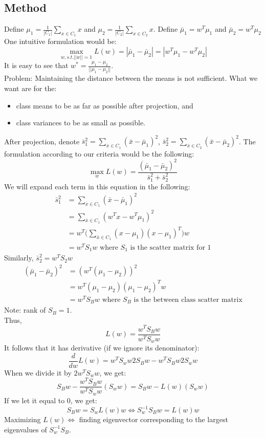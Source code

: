 \subsection{Method}
Define $\mu_1=\frac{1}{|C_1|} \sum_{x\in C_1} x$ and
$\mu_2=\frac{1}{|C_2|} \sum_{x\in C_2} x$. Define $\bar{\mu}_1=w^T
\mu_1$ and $\bar{\mu}_2=w^T \mu_2$\\ 
One intuitive formulation would be:
\[
\max_{w,s.t.||w||=1} L(w) = |\bar{\mu}_1 - \bar{\mu}_2| = |w^T\mu_1 - w^T\mu_2|
\]
It is easy to see that $w^*=\frac{\mu_1 - \mu_2}{||\mu_1-\mu_2||}$.\\

\noindent Problem: Maintaining the distance between the means is not
sufficient. What we want are for the: 
\begin{itemize}
\item class means to be as far as possible after projection, and
\item class variances to be as small as possible.
\end{itemize}
After projection, denote $\bar{s}_1^2 = \sum_{\bar{x}\in C_1}
(\bar{x}-\bar{\mu}_1)^2$, $\bar{s}_2^2 = \sum_{\bar{x}\in C_2}
(\bar{x}-\bar{\mu}_2)^2$. The formulation according to our criteria
would be the following: 
\[
\max_{w} L(w)=\frac{(\bar{\mu}_1 - \bar{\mu}_2)^2}{\bar{s}_1^2+\bar{s}_2^2}
\]
We will expand each term in this equation in the following:\\
\begin{align*}
\bar{s}_1^2
&= \sum_{\bar{x}\in C_1} (\bar{x}-\bar{\mu}_1)^2\\
&= \sum_{\bar{x}\in C_1} (w^Tx-w^T\mu_1)^2\\
&= w^T\Big (\sum_{\bar{x}\in C_1} (x-\mu_1)(x-\mu_1)^T \Big ) w\\
&= w^TS_1w \textrm{ where } S_1 \textrm{ is the scatter matrix for }1
\end{align*}
Similarly, $\bar{s}_2^2=w^TS_2w$\\
\begin{align*}
(\bar{\mu}_1-\bar{\mu}_2)^2
&= (w^T (\mu_1 - \mu_2))^2\\
&= w^T(\mu_1-\mu_2)(\mu_1-\mu_2)^Tw\\
&= w^TS_Bw \textrm{ where } S_B \textrm{ is the between class scatter
    matrix} 
\end{align*}
Note: rank of $S_B = 1$.\\
Thus,
\[
L(w)=\frac{w^T S_B w}{w^T S_w w}
\]
It follows that it has derivative (if we ignore its denominator):
\[
\frac{d}{dw}L(w)=w^TS_w w2S_B w - w^T S_B w 2 S_w w
\]
When we divide it by $2w^TS_ww$, we get:
\[
S_Bw - \frac{w^T S_B w}{w^T S_w w} (S_w w)=S_Bw - L(w)(S_w w)
\]
If we let it equal to 0, we get:
\[
S_B w = S_w L(w) w \Leftrightarrow S_w^{-1} S_B w = L(w) w
\]
Maximizing $L(w) \Leftrightarrow$ finding eigenvector corresponding to
the largest eigenvalues of $S_w^{-1} S_B$.\\ 

